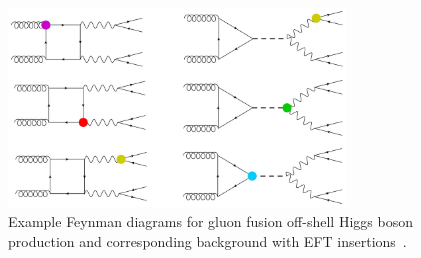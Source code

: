 \begin{figure}[!h]
\centering
\includegraphics[width=0.8\textwidth,clip] {figures/EFTdiagrams.jpg}
\caption{Example Feynman diagrams for gluon fusion off-shell Higgs boson production and corresponding background with EFT insertions~\cite{offshellWGnote}.}
\label{fig:EFTdiagrams}
\end{figure}






